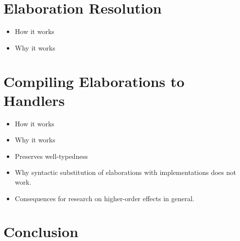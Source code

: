 \documentclass[twoside,a4paper,11pt]{memoir}
\begin{document}
\frontmatter
\thispagestyle{empty}
\maketitle
\makeformaltitlepages{}


\cleardoublepage\tableofcontents
\cleardoublepage\listoffigures
\cleardoublepage\listoftables
\cleardoublepage\mainmatter{}






\chapter{Elaboration Resolution}

\begin{itemize}
\item How it works
\item Why it works
\end{itemize}

\chapter{Compiling Elaborations to Handlers}

\begin{itemize}
\item How it works
\item Why it works
\item Preserves well-typedness
\item Why syntactic substitution of elaborations with implementations does not work.
\item Consequences for research on higher-order effects in general.
\end{itemize}

\chapter{Conclusion}

\printbibliography

\appendix
\def\chaptername{Appendix}

\end{document}
